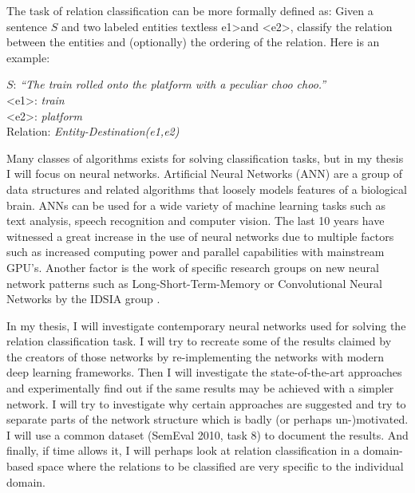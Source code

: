 \documentclass[12pt]{article}
\begin{document}
The task of relation classification can be more formally defined as:
Given a sentence $S$ and two labeled entities textless e1\textgreater and \textless e2\textgreater, classify the relation between the entities and (optionally) the ordering of the relation. Here is an example:

\begin{center}

$S$: \emph{``The train rolled onto the platform with a peculiar choo choo.''} \\

\textless e1\textgreater: \emph{train} \\
\textless e2\textgreater: \emph{platform} \\

Relation: \emph{Entity-Destination(e1,e2)}

\end{center}

Many classes of algorithms exists for solving classification tasks, but in my thesis I will focus on neural networks.
Artificial Neural Networks (ANN) are a group of data structures and related algorithms that loosely models features of a biological brain. ANNs can be used for a wide variety of machine learning tasks such as text analysis, speech recognition and computer vision. The last 10 years have witnessed a great increase in the use of neural networks due to multiple factors such as increased computing power and parallel capabilities with mainstream GPU's. Another factor is the work of specific research groups on new neural network patterns such as Long-Short-Term-Memory or Convolutional Neural Networks by the IDSIA group \cite{idsa}.

In my thesis, I will investigate contemporary neural networks used for solving the relation classification task. I will try to recreate some of the results claimed by the creators of those networks by re-implementing the networks with modern deep learning frameworks. Then I will investigate the state-of-the-art approaches and experimentally find out if the same results may be achieved with a simpler network. I will try to investigate why certain approaches are suggested and try to separate parts of the network structure which is badly (or perhaps un-)motivated. I will use a common dataset (SemEval 2010, task 8) to document the results. And finally, if time allows it, I will perhaps look at relation classification in a domain-based space where the relations to be classified are very specific to the individual domain. 
\end{document}
